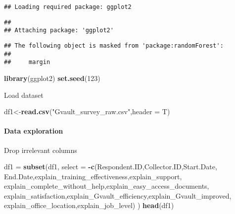 \documentclass[
]{article}
\newenvironment{Shaded}{\begin{snugshade}}{\end{snugshade}}
\newcommand{\DataTypeTok}[1]{\textcolor[rgb]{0.13,0.29,0.53}{#1}}
\newcommand{\DecValTok}[1]{\textcolor[rgb]{0.00,0.00,0.81}{#1}}
\newcommand{\KeywordTok}[1]{\textcolor[rgb]{0.13,0.29,0.53}{\textbf{#1}}}
\newcommand{\NormalTok}[1]{#1}
\newcommand{\OperatorTok}[1]{\textcolor[rgb]{0.81,0.36,0.00}{\textbf{#1}}}
\newcommand{\StringTok}[1]{\textcolor[rgb]{0.31,0.60,0.02}{#1}}
\begin{document}
\begin{verbatim}
## Loading required package: ggplot2
\end{verbatim}

\begin{verbatim}
## 
## Attaching package: 'ggplot2'
\end{verbatim}

\begin{verbatim}
## The following object is masked from 'package:randomForest':
## 
##     margin
\end{verbatim}

\begin{Shaded}
\begin{Highlighting}[]
\KeywordTok{library}\NormalTok{(ggplot2)  }
\KeywordTok{set.seed}\NormalTok{(}\DecValTok{123}\NormalTok{) }
\end{Highlighting}
\end{Shaded}

Load dataset

\begin{Shaded}
\begin{Highlighting}[]
\NormalTok{df1<-}\KeywordTok{read.csv}\NormalTok{(}\StringTok{"Gvault_survey_raw.csv"}\NormalTok{,}\DataTypeTok{header =}\NormalTok{ T)}
\end{Highlighting}
\end{Shaded}

\hypertarget{data-exploration}{%
\paragraph{Data exploration}\label{data-exploration}}

Drop irrelevant columns

\begin{Shaded}
\begin{Highlighting}[]
\NormalTok{df1 =}\StringTok{ }\KeywordTok{subset}\NormalTok{(df1, }\DataTypeTok{select =} \OperatorTok{-}\KeywordTok{c}\NormalTok{(Respondent.ID,Collector.ID,Start.Date,}
\NormalTok{          End.Date,explain_training_effectiveness,explain_support,}
\NormalTok{          explain_complete_without_help,explain_easy_access_documents,}
\NormalTok{          explain_satisfaction,explain_Gvault_efficiency,explain_Gvault_improved, explain_office_location,explain_job_level) )}
\KeywordTok{head}\NormalTok{(df1)}
\end{Highlighting}
\end{Shaded}
\end{document}

